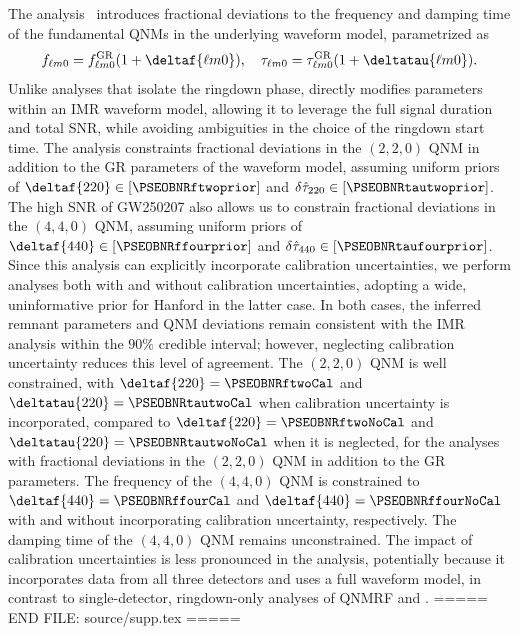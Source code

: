 The \PSEOBNR{} analysis~\cite{Brito:2018rfr,Ghosh:2021mrv,Maggio:2022hre,Toubiana:2023cwr,Pompili:2025cdc} introduces fractional deviations to the frequency and damping time of the fundamental \acp{QNM} in the underlying \SEOBNRFIVEPHM{} waveform model, parametrized as
\begin{equation}
f_{\ell m 0} = f_{\ell m 0}^{\mathrm{GR}} (1+\deltaf{\ell m 0}), \quad \tau_{\ell m 0} = \tau_{\ell m 0}^{\mathrm{GR}} (1+\deltatau{\ell m 0}) .
\end{equation}
Unlike analyses that isolate the ringdown phase, \PSEOBNR{} directly modifies parameters within an \ac{IMR} waveform model, allowing it to leverage the full signal duration and total \ac{SNR}, while avoiding ambiguities in the choice of the ringdown start time.
The analysis constraints fractional deviations in the $(2,2,0)$ \ac{QNM} in addition to the \ac{GR} parameters of the waveform model, assuming uniform priors of $\deltaf{220} \in [\PSEOBNRftwoprior]$ and $\delta \hat{\tau}_{220} \in [\PSEOBNRtautwoprior]$.
The high \ac{SNR} of \ac{GW250207} also allows us to constrain fractional deviations in the $(4,4,0)$ \ac{QNM}, assuming uniform priors of $\deltaf{440} \in [\PSEOBNRffourprior]$ and $\delta \hat{\tau}_{440} \in [\PSEOBNRtaufourprior]$.
Since this analysis can explicitly incorporate calibration uncertainties, we perform analyses both with and without calibration uncertainties, adopting a wide, uninformative prior for Hanford in the latter case.
In both cases, the inferred remnant parameters and \ac{QNM} deviations remain consistent with the \ac{IMR} analysis within the $90\%$ credible interval; however, neglecting calibration uncertainty reduces this level of agreement.
The $(2,2,0)$ \ac{QNM} is well constrained, with $\deltaf{220} = \PSEOBNRftwoCal$ and $\deltatau{220} = \PSEOBNRtautwoCal$ when calibration uncertainty is incorporated, compared to $\deltaf{220} = \PSEOBNRftwoNoCal$ and $\deltatau{220} = \PSEOBNRtautwoNoCal$ when it is neglected, for the analyses with fractional deviations in the $(2,2,0)$ \ac{QNM} in addition to the \ac{GR} parameters.
The frequency of the $(4,4,0)$ \ac{QNM} is constrained to $\deltaf{440} = \PSEOBNRffourCal$ and $\deltaf{440} = \PSEOBNRffourNoCal$ with and without incorporating calibration uncertainty, respectively.
The damping time of the $(4,4,0)$ \ac{QNM} remains unconstrained.
The impact of calibration uncertainties is less pronounced in the \PSEOBNR{} analysis, potentially because it incorporates data from all three detectors and uses a full waveform model, in contrast to single-detector, ringdown-only analyses of \ac{QNMRF} and \RINGDOWN{}.
===== END FILE: source/supp.tex =====

